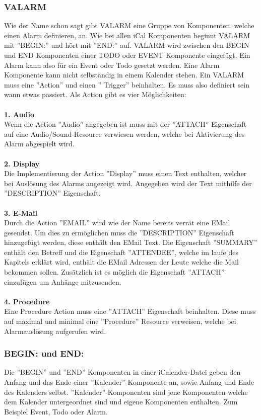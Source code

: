 \subsubsection{VALARM}
\label{sec:vAlarm} 
Wie der Name schon sagt gibt VALARM eine Gruppe von Komponenten, welche einen Alarm definieren, an.  Wie bei allen iCal Komponenten beginnt VALARM mit ''BEGIN:'' und hört mit ''END:'' auf. VALARM wird zwischen den BEGIN und END Komponenten einer TODO oder EVENT Komponente eingefügt. Ein Alarm kann also für ein Event oder Todo gesetzt werden. Eine Alarm Komponente kann nicht selbständig in einem Kalender stehen. Ein VALARM muss eine ''Action'' und einen '' Trigger'' beinhalten. Es muss also definiert sein wann etwas passiert. Als Action gibt es vier Möglichkeiten: \\ \\
\textbf{1. Audio} \\
Wenn die Action ''Audio'' angegeben ist muss mit der ''ATTACH'' Eigenschaft auf eine Audio/Sound-Resource verwiesen werden, welche bei Aktivierung des Alarm abgespielt wird. \\ \\
\textbf{2. Display} \\ 
Die Implementierung der Action ''Display'' muss einen Text enthalten, welcher bei Auslösung des Alarms angezeigt wird. Angegeben wird der Text mithilfe der ''DESCRIPTION'' Eigenschaft. \\ \\
\textbf{3. E-Mail} \\ 
Durch die Action ''EMAIL'' wird wie der Name bereits verrät eine EMail gesendet. Um dies zu ermöglichen muss die ''DESCRIPTION'' Eigenschaft hinzugefügt werden, diese enthält den EMail Text. Die Eigenschaft ''SUMMARY'' enthält den Betreff und die Eigenschaft ''ATTENDEE'', welche im laufe des Kapitels erklärt wird, enthält die EMail Adressen der Leute welche die Mail bekommen sollen. Zusätzlich ist es möglich die Eigenschaft ''ATTACH'' einzufügen um Anhänge mitzusenden. \\ \\
\textbf{4. Procedure} \\ %
Eine Procedure Action muss eine ''ATTACH'' Eigenschaft beinhalten. Diese muss auf maximal und minimal eine ''Procedure'' Resource verweisen, welche bei Alarmauslösung aufgerufen wird.
\subsubsection{BEGIN: und END:}
\label{sec:beginUndEnd} 
Die ''BEGIN'' und ''END'' Komponenten in einer iCalender-Datei geben den Anfang und das Ende einer ''Kalender''-Komponente an, sowie Anfang und Ende des Kalenders selbst. ''Kalender''-Komponenten sind jene Komponenten welche dem Kalender untergeordnet sind und eigene Komponenten enthalten. Zum Beispiel Event, Todo oder Alarm. 
